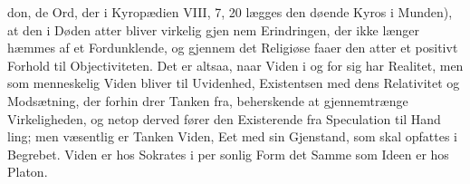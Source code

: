\documentclass[12pt,a4paper]{book}
\begin{document}
don, de Ord, der i Kyropædien VIII, 7, 20 lægges den døende
Kyros i Munden), at den i Døden atter bliver virkelig gjen\-%
nem Erindringen, der ikke længer hæmmes af et Fordunklende,
og gjennem det Religiøse faaer den atter et positivt Forhold
til Objectiviteten. Det er altsaa, naar Viden i og for sig har
Realitet, men som menneskelig Viden bliver til Uvidenhed,
Existentsen med dens Relativitet og Modsætning, der forhin\-%
drer Tanken fra, beherskende at gjennemtrænge Virkeligheden,
og netop derved fører den Existerende fra Speculation til Hand\-%
ling; men væsentlig er Tanken Viden, Eet med sin Gjenstand,
som skal opfattes i Begrebet. Viden er hos Sokrates i per\-%
sonlig Form det Samme som Ideen er hos Platon.
\end{document}
